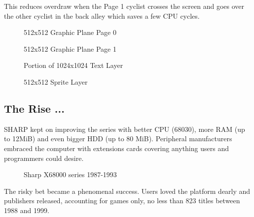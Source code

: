 This reduces overdraw when the Page 1 cyclist crosses the screen and goes over the other cyclist in the back alley which saves a few CPU cycles.

\begin{minipage}[t]{0.49\linewidth}
\setlength{\intextsep}{0pt}
\begin{figure}[H]
\caption*{512x512 Graphic Plane Page 0}
\end{figure}
\end{minipage}%
\hfill
\begin{minipage}[t]{0.49\linewidth}
\setlength{\intextsep}{0pt}
  \begin{figure}[H]
  \caption*{512x512 Graphic Plane Page 1}
  \end{figure}
\end{minipage}%

\begin{minipage}[t]{0.49\linewidth}
  \begin{figure}[H]
  \caption*{Portion of 1024x1024 Text Layer}
  \end{figure}
\end{minipage}%
\hfill
\begin{minipage}[t]{0.49\linewidth}
   \begin{figure}[H]
  \caption*{512x512 Sprite Layer}
  \end{figure}
\end{minipage}%



\subsection{The Rise ...}
 SHARP kept on improving the series with better CPU (68030), more RAM (up to 12MiB) and even bigger HDD (up to 80 MiB). Peripheral manufacturers embraced the computer with extensions cards covering anything users and programmers could desire. 


\begin{figure}[H]
\caption*{Sharp X68000 series 1987-1993}
\end{figure}






 The risky bet became a phenomenal success. Users loved the platform dearly and publishers released, accounting for games only, no less than 823 titles between 1988 and 1999.


